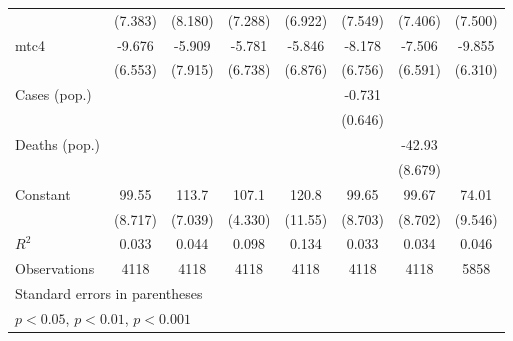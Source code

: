 \documentclass{article}
\begin{document}
{\begin{longtable}{l*{7}{c}}
                &  (7.383)         &  (8.180)         &  (7.288)         &  (6.922)         &  (7.549)         &  (7.406)         &  (7.500)         \\
mtc4            &   -9.676         &   -5.909         &   -5.781         &   -5.846         &   -8.178         &   -7.506         &   -9.855         \\
                &  (6.553)         &  (7.915)         &  (6.738)         &  (6.876)         &  (6.756)         &  (6.591)         &  (6.310)         \\
Cases (pop.)    &                  &                  &                  &                  &   -0.731         &                  &                  \\
                &                  &                  &                  &                  &  (0.646)         &                  &                  \\
Deaths (pop.)   &                  &                  &                  &                  &                  &   -42.93\sym{***}&                  \\
                &                  &                  &                  &                  &                  &  (8.679)         &                  \\
Constant        &    99.55\sym{***}&    113.7\sym{***}&    107.1\sym{***}&    120.8\sym{***}&    99.65\sym{***}&    99.67\sym{***}&    74.01\sym{***}\\
                &  (8.717)         &  (7.039)         &  (4.330)         &  (11.55)         &  (8.703)         &  (8.702)         &  (9.546)         \\
\hline
\(R^{2}\)       &    0.033         &    0.044         &    0.098         &    0.134         &    0.033         &    0.034         &    0.046         \\
Observations    &     4118         &     4118         &     4118         &     4118         &     4118         &     4118         &     5858         \\
\hline\hline
\multicolumn{8}{l}{\footnotesize Standard errors in parentheses}\\
\multicolumn{8}{l}{\footnotesize \sym{*} \(p<0.05\), \sym{**} \(p<0.01\), \sym{***} \(p<0.001\)}\\
\end{longtable}
}
\end{document}
